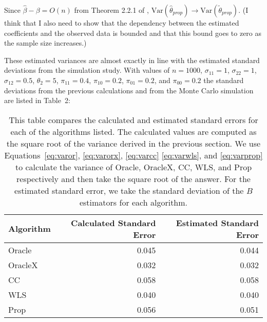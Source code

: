 \documentclass[12pt]{article}
\newcommand{\Var}{{\text{Var}}}
\begin{document}
Since $\hat \beta - \beta = O(n)$ from Theorem 2.2.1 of \cite{fuller2009sampling}, 
$\Var(\hat \theta_{prop}) \to \Var(\tilde \theta_{prop})$. (I think that 
I also need to show that the dependency between the estimated 
coefficients and the observed data is bounded and that this bound goes 
to zero as the sample size increases.)

These estimated variances are almost exactly in line with the estimated
standard deviations from the simulation study. With values of $n = 1000$,
$\sigma_{11} = 1$, $\sigma_{22} = 1$, $\sigma_{12} = 0.5$, $\theta_2 = 5$,
$\pi_{11} = 0.4$, $\pi_{10} = 0.2$, $\pi_{01} = 0.2$, and $\pi_{00} = 0.2$
the standard deviations from the previous calculations and from the Monte Carlo
simulation are listed in Table~2:

\begin{table}[!ht]
  \centering
  \label{tab:calmc}
  \caption{This table compares the calculated and estimated standard 
  errors for each of the algorithms listed. The calculated values are 
  computed as the square root of the variance derived in the previous 
  section. We use Equations~\ref{eq:varor}, \ref{eq:varorx}, \ref{eq:varcc}
  \ref{eq:varwls}, and \ref{eq:varprop} to calculate the variance of 
  Oracle, OracleX, CC, WLS, and Prop respectively and then take the square
  root of the answer. For the estimated standard error, we take the 
  standard deviation of the $B$ estimators for each algorithm.}
  \begin{tabular}{lrr}
    \toprule
    Algorithm & Calculated Standard Error & Estimated Standard Error \\
    \midrule
    Oracle  & 0.045 & 0.044 \\
    OracleX & 0.032 & 0.032 \\
    CC      & 0.058 & 0.058 \\
    WLS     & 0.040 & 0.040 \\
    Prop    & 0.056 & 0.051 \\
    \bottomrule
  \end{tabular}
\end{table}
\end{document}
